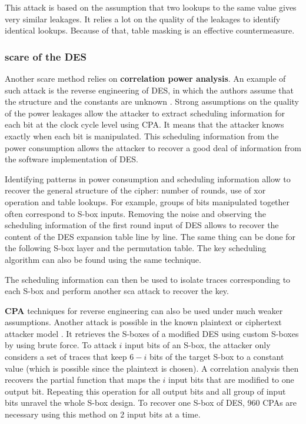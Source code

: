 \documentclass[11pt]{sdm}
\begin{document}
This attack is based on the assumption that two lookups to the same value gives very similar leakages.
It relies a lot on the quality of the leakages to identify identical lookups.
Because of that, table masking is an effective countermeasure.


\subsubsection{\gls{scare} of the DES}
\label{scare_des}

Another \gls{scare} method relies on \textbf{correlation power analysis}.
An example of such attack is the reverse engineering of DES, in which the authors assume that the structure and the constants are unknown \parencite{Daudigny_Ledig_Muller_Valette_2005}.
Strong assumptions on the quality of the power leakages allow the attacker to extract scheduling information for each bit at the clock cycle level using CPA.
It means that the attacker knows exactly when each bit is manipulated.
This scheduling information from the power consumption allows the attacker to recover a good deal of information from the software implementation of DES.

Identifying patterns in power consumption and scheduling information allow to recover the general structure of the cipher: number of rounds, use of xor operation and table lookups.
For example, groups of bits manipulated together often correspond to S-box inputs.
Removing the noise and observing the scheduling information of the first round input of DES allows to recover the content of the DES expansion table line by line.
The same thing can be done for the following S-box layer and the permutation table.
The key scheduling algorithm can also be found using the same technique.

The scheduling information can then be used to isolate traces corresponding to each S-box and perform another \gls{sca} attack to recover the key.


\textbf{CPA} techniques for reverse engineering can also be used under much weaker assumptions.
Another attack is possible in the known plaintext or ciphertext attacker model \parencite{Guilley_Sauvage_Micolod_Réal_Valette_2010}.
It retrieves the S-boxes of a modified DES using custom S-boxes by using brute force.
To attack $i$ input bits of an S-box, the attacker only considers a set of traces that keep $6-i$ bits of the target S-box to a constant value (which is possible since the plaintext is chosen).
A correlation analysis then recovers the partial function that maps the $i$ input bits that are modified to one output bit.
Repeating this operation for all output bits and all group of input bits unravel the whole S-box design.
To recover one S-box of DES, 960 CPAs are necessary using this method on 2 input bits at a time.
\end{document}
